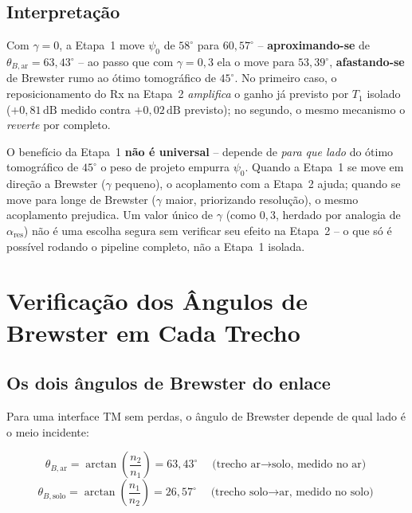 \documentclass[12pt,a4paper,oneside]{book}
\newcommand{\result}[2]{%
  \begin{tcolorbox}[enhanced, breakable,
    colback=yellow!8, colframe=orange!70!black,
    fonttitle=\bfseries,
    title={\protect#1},
    attach boxed title to top left={yshift=-2mm, xshift=5mm},
    boxed title style={colback=orange!70!black}]
    #2
  \end{tcolorbox}}
\theoremstyle{definition}
\theoremstyle{remark}
\newcommand{\thetaBar}{\theta_{B,\mathrm{ar}}}
\newcommand{\thetaBsolo}{\theta_{B,\mathrm{solo}}}
\newcommand{\nuno}{n_1}
\newcommand{\ndos}{n_2}
\begin{document}
\section{Interpretação}

Com $\gamma=0$, a Etapa~1 move $\psi_0$ de $58^\circ$ para $60{,}57^\circ$
-- \textbf{aproximando-se} de $\thetaBar=63{,}43^\circ$ -- ao passo que com
$\gamma=0{,}3$ ela o move para $53{,}39^\circ$, \textbf{afastando-se} de
Brewster rumo ao ótimo tomográfico de $45^\circ$. No primeiro caso, o
reposicionamento do Rx na Etapa~2 \emph{amplifica} o ganho já previsto por
$T_1$ isolado ($+0{,}81\,\mathrm{dB}$ medido contra $+0{,}02\,\mathrm{dB}$
previsto); no segundo, o mesmo mecanismo o \emph{reverte} por completo.

\result{Conclusão do Capítulo}{
O benefício da Etapa~1 \textbf{não é universal} -- depende de \emph{para
que lado} do ótimo tomográfico de $45^\circ$ o peso de projeto empurra
$\psi_0$. Quando a Etapa~1 se move em direção a Brewster
($\gamma$ pequeno), o acoplamento com a Etapa~2 ajuda; quando se move
para longe de Brewster ($\gamma$ maior, priorizando resolução), o mesmo
acoplamento prejudica. Um valor único de $\gamma$ (como $0{,}3$, herdado
por analogia de $\alpha_{\mathrm{res}}$) não é uma escolha segura sem
verificar seu efeito na Etapa~2 -- o que só é possível rodando o pipeline
completo, não a Etapa~1 isolada.
}

\chapter{Verificação dos Ângulos de Brewster em Cada Trecho}
\label{cap:verificacao_angulos}

\section{Os dois ângulos de Brewster do enlace}

Para uma interface TM sem perdas, o ângulo de Brewster depende de qual lado
é o meio incidente:

\begin{equation}
  \thetaBar = \arctan\!\left(\frac{\ndos}{\nuno}\right) = 63{,}43^\circ
  \quad\text{(trecho ar$\to$solo, medido no ar)}
\end{equation}
\begin{equation}
  \thetaBsolo = \arctan\!\left(\frac{\nuno}{\ndos}\right) = 26{,}57^\circ
  \quad\text{(trecho solo$\to$ar, medido no solo)}
\end{equation}
\end{document}
